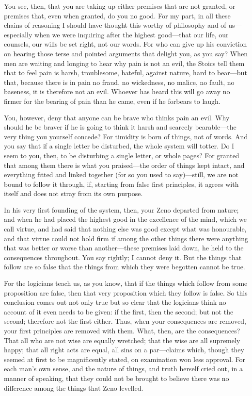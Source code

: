  You see, then, that you are taking up either premises that are not granted, or premises that, even when granted, do you no good. For my part, in all these chains of reasoning I should have thought this worthy of philosophy and of us—especially when we were inquiring after the highest good—that our life, our counsels, our wills be set right, not our words. For who can give up his conviction on hearing those terse and pointed arguments that delight you, as you say? When men are waiting and longing to hear why pain is not an evil, the Stoics tell them that to feel pain is harsh, troublesome, hateful, against nature, hard to bear—but that, because there is in pain no fraud, no wickedness, no malice, no fault, no baseness, it is therefore not an evil. Whoever has heard this will go away no firmer for the bearing of pain than he came, even if he forbears to laugh.

 You, however, deny that anyone can be brave who thinks pain an evil. Why should he be braver if he is going to think it harsh and scarcely bearable—the very thing you yourself concede? For timidity is born of things, not of words. And you say that if a single letter be disturbed, the whole system will totter. Do I seem to you, then, to be disturbing a single letter, or whole pages? For granted that among them there is what you praised—the order of things kept intact, and everything fitted and linked together (for so you used to say)—still, we are not bound to follow it through, if, starting from false first principles, it agrees with itself and does not stray from its own purpose.

 In his very first founding of the system, then, your Zeno departed from nature; and when he had placed the highest good in the excellence of the mind, which we call virtue, and had said that nothing else was good except what was honourable, and that virtue could not hold firm if among the other things there were anything that was better or worse than another—these premises laid down, he held to the consequences throughout. You say rightly; I cannot deny it. But the things that follow are so false that the things from which they were begotten cannot be true.

 For the logicians teach us, as you know, that if the things which follow from some proposition are false, then that very proposition which they follow is false. So this conclusion comes out not only true but so clear that the logicians think no account of it even needs to be given: if the first, then the second; but not the second; therefore not the first either. Thus, when your consequences are removed, your first principles are removed with them. What, then, are the consequences? That all who are not wise are equally wretched; that the wise are all supremely happy; that all right acts are equal, all sins on a par—claims which, though they seemed at first to be magnificently stated, on examination won less approval. For each man's own sense, and the nature of things, and truth herself cried out, in a manner of speaking, that they could not be brought to believe there was no difference among the things that Zeno levelled.

